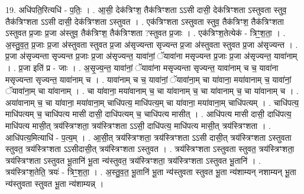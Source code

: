 \documentclass[17pt]{extarticle}
\begin{document}
19. अधि॑पति॒रित्यधि॑ - प॒तिः॒ । . आ॒सी॒ देक॑त्रिꣳश॒ तैक॑त्रिꣳशता ऽऽसी दासी॒ देक॑त्रिꣳशता ऽस्तुवता स्तुव॒ तैक॑त्रिꣳशता ऽऽसी दासी॒ देक॑त्रिꣳशता ऽस्तुवत । . एक॑त्रिꣳशता ऽस्तुवता स्तुव॒ तैक॑त्रिꣳश॒ तैक॑त्रिꣳशता ऽस्तुवत प्र॒जाः प्र॒जा अ॑स्तुव॒ तैक॑त्रिꣳश॒
तैक॑त्रिꣳशता ?स्तुवत प्र॒जाः । . एक॑त्रिꣳश॒तेत्येक॑ - त्रिꣳ॒॒श॒ता॒ । . अ॒स्तु॒व॒त॒ प्र॒जाः प्र॒जा अ॑स्तुवता स्तुवत प्र॒जा अ॑सृज्यन्ता सृज्यन्त प्र॒जा अ॑स्तुवता स्तुवत प्र॒जा अ॑सृज्यन्त । . प्र॒जा अ॑सृज्यन्ता सृज्यन्त प्र॒जाः प्र॒जा अ॑सृज्यन्त॒ यावा॑नां॒ ॅयावा॑ना मसृज्यन्त प्र॒जाः प्र॒जा अ॑सृज्यन्त॒ यावा॑नाम् । . प्र॒जा इति॑ प्र - जाः । . अ॒सृ॒ज्य॒न्त॒ यावा॑नां॒ ॅयावा॑ना मसृज्यन्ता सृज्यन्त॒ यावा॑नाम् च च॒ यावा॑ना मसृज्यन्ता सृज्यन्त॒ यावा॑नाम् च । . यावा॑नाम् च च॒ यावा॑नां॒ ॅयावा॑ना॒म् चा या॑वाना॒ मया॑वानाम् च॒ यावा॑नां॒ ॅयावा॑ना॒म् चा या॑वानाम् । . चा या॑वाना॒ मया॑वानाम् च॒ चा या॑वानाम् च॒ चा या॑वानाम् च॒ चा या॑वानाम् च । . अया॑वानाम् च॒ चा या॑वाना॒ मया॑वाना॒म् चाधि॑पत्य॒ माधि॑पत्य॒म् चा या॑वाना॒ मया॑वाना॒म् चाधि॑पत्यम् । . चाधि॑पत्य॒ माधि॑पत्यम् च॒ चाधि॑पत्य मासी दासी॒ दाधि॑पत्यम् च॒ चाधि॑पत्य मासीत् । . आधि॑पत्य मासी दासी॒ दाधि॑पत्य॒ माधि॑पत्य मासी॒त् त्रय॑स्त्रिꣳशता॒ त्रय॑स्त्रिꣳशता ऽऽसी॒ दाधि॑पत्य॒ माधि॑पत्य मासी॒त् त्रय॑स्त्रिꣳशता । . आधि॑पत्य॒मित्याधि॑ - प॒त्य॒म् । . आ॒सी॒त् त्रय॑स्त्रिꣳशता॒ त्रय॑स्त्रिꣳशता ऽऽसी दासी॒त् त्रय॑स्त्रिꣳशता ऽस्तुवता स्तुवत॒ त्रय॑स्त्रिꣳशता ऽऽसीदासी॒त् त्रय॑स्त्रिꣳशता ऽस्तुवत । . त्रय॑स्त्रिꣳशता ऽस्तुवता स्तुवत॒ त्रय॑स्त्रिꣳशता॒ त्रय॑स्त्रिꣳशता ऽस्तुवत भू॒तानि॑ भू॒ता न्य॑स्तुवत॒ त्रय॑स्त्रिꣳशता॒ त्रय॑स्त्रिꣳशता ऽस्तुवत भू॒तानि॑ । . त्रय॑स्त्रिꣳश॒तेति॒ त्रयः॑ - त्रिꣳ॒॒श॒ता॒ । . अ॒स्तु॒व॒त॒ भू॒तानि॑ भू॒ता न्य॑स्तुवता स्तुवत भू॒ता न्य॑शाम्यन् नशाम्यन् भू॒ता न्य॑स्तुवता स्तुवत 
भू॒ता न्य॑शाम्यन्न् । \newline
\end{document}
